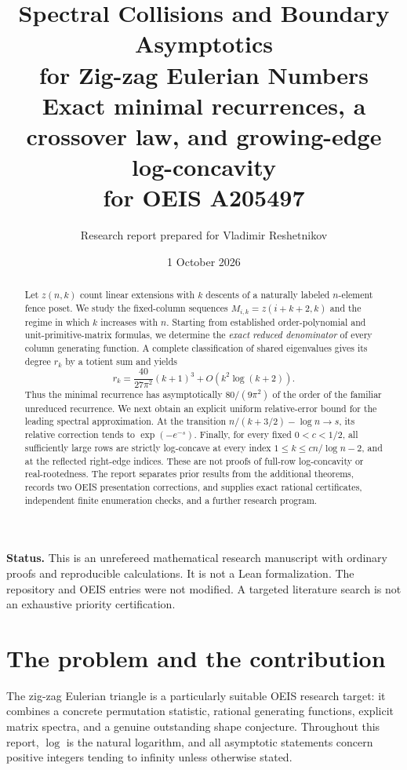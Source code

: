 \documentclass[11pt,a4paper]{article}
\title{\vspace{-1.2cm}\textbf{Spectral Collisions and Boundary Asymptotics\\for Zig-zag Eulerian Numbers}\\[0.5em]
\large Exact minimal recurrences, a crossover law, and growing-edge log-concavity\\for OEIS A205497}
\author{Research report prepared for Vladimir Reshetnikov}
\date{1 October 2026}
\theoremstyle{definition}
\begin{document}
\maketitle
\thispagestyle{empty}
\begin{abstract}
Let $z(n,k)$ count linear extensions with $k$ descents of a naturally labeled
$n$-element fence poset.  We study the fixed-column sequences
$M_{i,k}=z(i+k+2,k)$ and the regime in which $k$ increases with $n$.
Starting from established order-polynomial and unit-primitive-matrix formulas,
we determine the \emph{exact reduced denominator} of every column generating
function.  A complete classification of shared eigenvalues gives its degree
$r_k$ by a totient sum and yields
\[
 r_k=\frac{40}{27\pi^2}(k+1)^3+O(k^2\log(k+2)).
\]
Thus the minimal recurrence has asymptotically $80/(9\pi^2)$ of the order of
the familiar unreduced recurrence.
We next obtain an explicit uniform relative-error bound for the leading
spectral approximation.  At the transition
$n/(k+3/2)-\log n\to s$, its relative correction tends to
$\exp(-e^{-s})$.  Finally, for every fixed $0<c<1/2$, all sufficiently large
rows are strictly log-concave at every index
$1\le k\le c n/\log n-2$, and at the reflected right-edge indices.
These are not proofs of full-row log-concavity or real-rootedness.
The report separates prior results from the additional theorems, records two
OEIS presentation corrections, and supplies exact rational certificates,
independent finite enumeration checks, and a further research program.
\end{abstract}
\vfill
\noindent\textbf{Status.} This is an unrefereed mathematical research manuscript with
ordinary proofs and reproducible calculations.  It is not a Lean formalization.
The repository and OEIS entries were not modified.  A targeted literature
search is not an exhaustive priority certification.
\newpage
\begingroup
\small
\setlength{\parskip}{0pt}
\tableofcontents
\endgroup
\newpage

\section{The problem and the contribution}
\label{zz:sec:intro}
The zig-zag Eulerian triangle is a particularly suitable OEIS research target:
it combines a concrete permutation statistic, rational generating functions,
explicit matrix spectra, and a genuine outstanding shape conjecture.
Throughout this report, $\log$ is the natural logarithm, and all asymptotic
statements concern positive integers tending to infinity unless otherwise stated.
\end{document}
